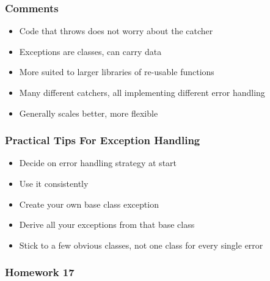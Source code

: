 \subsubsection{Comments}\label{comments}

\begin{itemize}
\itemsep1pt\parskip0pt
\item
  Code that throws does not worry about the catcher
\item
  Exceptions are classes, can carry data
\item
  More suited to larger libraries of re-usable functions
\item
  Many different catchers, all implementing different error handling
\item
  Generally scales better, more flexible
\end{itemize}

\subsubsection{Practical Tips For Exception
Handling}\label{practical-tips-for-exception-handling}

\begin{itemize}
\itemsep1pt\parskip0pt
\item
  Decide on error handling strategy at start
\item
  Use it consistently
\item
  Create your own base class exception
\item
  Derive all your exceptions from that base class
\item
  Stick to a few obvious classes, not one class for every single error
\end{itemize}

\subsubsection{Homework 17}\label{homework-17}

